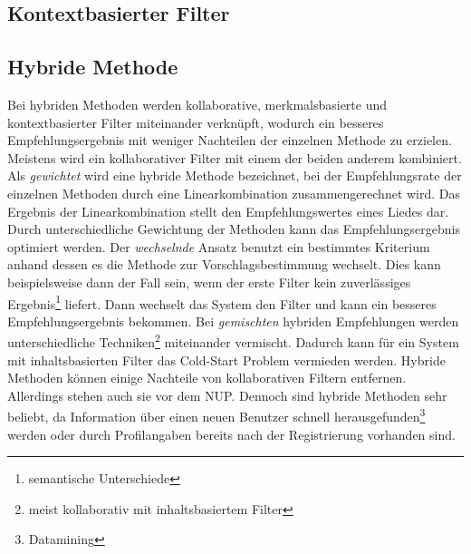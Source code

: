 \documentclass[twosided,a4,10pt]{article}
\begin{document}
\begin{multicols}{2}
		\subsection{Kontextbasierter Filter}

				
		\subsection{Hybride Methode}
		Bei hybriden Methoden werden kollaborative, merkmalsbasierte und kontextbasierter Filter miteinander verknüpft, wodurch ein besseres Empfehlungsergebnis mit weniger Nachteilen der einzelnen Methode zu erzielen. Meistens wird ein kollaborativer Filter mit einem der beiden anderem kombiniert.\newline
		Als \textit{gewichtet} wird eine hybride Methode bezeichnet, bei der Empfehlungsrate der einzelnen Methoden durch eine Linearkombination zusammengerechnet wird. Das Ergebnis der Linearkombination stellt den Empfehlungswertes eines Liedes dar. Durch unterschiedliche Gewichtung der Methoden kann das Empfehlungsergebnis optimiert werden. Der \textit{wechselnde} Ansatz benutzt ein bestimmtes Kriterium anhand dessen es die Methode zur Vorschlagsbestimmung wechselt. Dies kann beispielsweise dann der Fall sein, wenn der erste Filter kein zuverlässiges Ergebnis\footnote[6]{semantische Unterschiede} liefert. Dann wechselt das System den Filter und kann ein besseres Empfehlungsergebnis bekommen. Bei \textit{gemischten} hybriden Empfehlungen werden unterschiedliche Techniken\footnote[7]{meist kollaborativ mit inhaltsbasiertem Filter} miteinander vermischt. Dadurch kann für ein System mit inhaltsbasierten Filter das Cold-Start Problem vermieden werden.\newline
		Hybride Methoden können einige Nachteile von kollaborativen Filtern entfernen. Allerdings stehen auch sie vor dem NUP. Dennoch sind hybride Methoden sehr beliebt, da Information über einen neuen Benutzer schnell herausgefunden\footnote[8]{Datamining} werden oder durch Profilangaben bereits nach der Registrierung vorhanden sind. \cite{burke}


\end{multicols}
\end{document}
